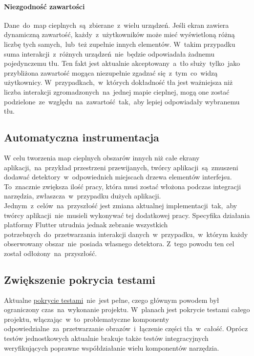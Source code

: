\paragraph{Niezgodność zawartości}
Dane~do~map cieplnych~są~zbierane~z~wielu urządzeń. Jeśli ekran zawiera dynamiczną zawartość, każdy~z~użytkowników może mieć wyświetloną różną liczbę tych samych,~lub~też zupełnie innych elementów. W~takim przypadku suma interakcji~z~różnych urządzeń~nie~będzie odpowiadała żadnemu pojedynczemu tłu. Ten fakt jest aktualnie akceptowany~a~tło służy~tylko~jako przybliżona zawartość mogąca niezupełnie zgadzać się~z~tym~co~widzą użytkownicy. W~przypadkach,~w~których dokładność tła jest ważniejsza niż liczba interakcji zgromadzonych~na~jednej mapie cieplnej, mogą one zostać podzielone~ze~względu~na~zawartość~tak,~aby lepiej odpowiadały wybranemu tłu.

\subsection{Automatyczna instrumentacja}
\label{sec:auto_instrumentation}
W celu tworzenia map cieplnych obszarów innych niż całe ekrany aplikacji,~na~przykład przestrzeni przewijanych, twórcy aplikacji~są~zmuszeni dodawać detektory~w~odpowiednich miejscach drzewa elementów interfejsu. To~znacznie zwiększa ilość pracy, która musi zostać włożona podczas integracji narzędzia, zwłaszcza~w~przypadku dużych aplikacji. Jednym~z~celów~na~przyszłość jest zmiana aktualnej implementacji~tak,~aby twórcy aplikacji~nie~musieli wykonywać tej dodatkowej pracy. Specyfika działania platformy Flutter utrudnia jednak zebranie wszystkich potrzebnych~do~przetwarzania interakcji danych~w~przypadku,~w~którym każdy obserwowany obszar~nie~posiada własnego detektora. Z~tego powodu ten cel został odłożony~na~przyszłość.

\subsection{Zwiększenie pokrycia testami}
\label{sec:future_coverage}
Aktualne \hyperref[par:test_coverage]{pokrycie testami}~nie~jest pełne, czego głównym powodem był ograniczony czas~na~wykonanie projektu. W~planach jest pokrycie testami całego projektu, włączając~w~to~problematyczne komponenty odpowiedzialne~za~przetwarzanie obrazów~i~łączenie części tła~w~całość. Oprócz testów jednostkowych aktualnie brakuje także testów integracyjnych weryfikujących poprawne współdziałanie wielu komponentów narzędzia.

